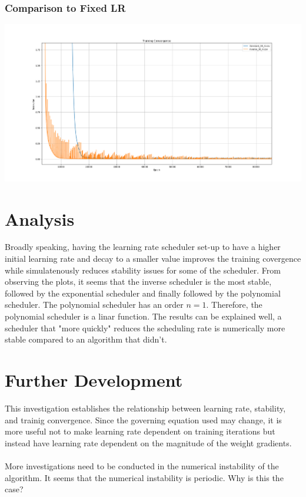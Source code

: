 \documentclass[a4paper, 12pt]{report}
\def\size{0.39}
\begin{document}
\begin{center}
\subsubsection{Comparison to Fixed LR}

\includegraphics[scale=\size]{Comparison_Inverse.png}
\section{Analysis}

Broadly speaking, having the learning rate scheduler set-up to have a higher initial learning rate and decay to a smaller value improves the training covergence while simulatenously reduces stability issues for some of the scheduler. From observing the plots, it seems that the inverse scheduler is the most stable, followed by the exponential scheduler and finally followed by the polynomial scheduler. The polynomial scheduler has an order $n = 1$. Therefore, the polynomial scheduler is a linar function. The results can be explained well, a scheduler that "more quickly" reduces the scheduling rate is numerically more stable compared to an algorithm that didn't.
\section{Further Development}

This investigation establishes the relationship between learning rate, stability, and trainig convergence. Since the governing equation used may change, it is more useful not to make learning rate dependent on training iterations but instead have learning rate dependent on the magnitude of the weight gradients.
\\~\\More investigations need to be conducted in the numerical instability of the algorithm. It seems that the numerical instability is periodic. Why is this the case? 
\end{center}
\end{document}
